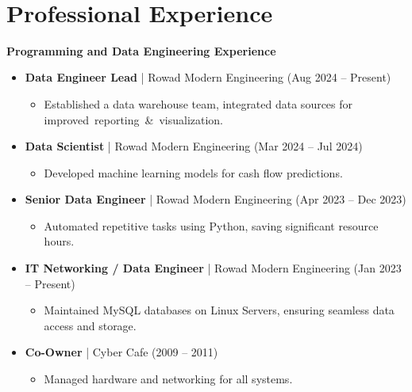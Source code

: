 \documentclass[10pt, letterpaper]{article}
\begin{document}
    \section{Professional Experience}
\textbf{\textcolor{primaryColor}{Programming and Data Engineering Experience}}
\begin{itemize}[leftmargin=*]
    \item \textbf{Data Engineer Lead} | Rowad Modern Engineering (Aug 2024 – Present)
    \begin{itemize}[leftmargin=1cm]
        \item Established a data warehouse team, integrated data sources for \mbox{improved reporting & visualization}.
    \end{itemize}
    \item \textbf{Data Scientist} | Rowad Modern Engineering (Mar 2024 – Jul 2024)
    \begin{itemize}[leftmargin=1cm]
        \item Developed machine learning models for cash flow predictions.
    \end{itemize}
    \item \textbf{Senior Data Engineer} | Rowad Modern Engineering (Apr 2023 – Dec 2023)
    \begin{itemize}[leftmargin=1cm]
        \item Automated repetitive tasks using Python, saving significant resource hours.
    \end{itemize}
    \item \textbf{IT Networking / Data Engineer} | Rowad Modern Engineering (Jan 2023 – Present)
    \begin{itemize}[leftmargin=1cm]
        \item Maintained MySQL databases on Linux Servers, ensuring seamless data access and storage.
    \end{itemize}
    \item \textbf{Co-Owner} | Cyber Cafe (2009 – 2011)
    \begin{itemize}[leftmargin=1cm]
        \item Managed hardware and networking for all systems.
    \end{itemize}
\end{itemize}
\end{document}
